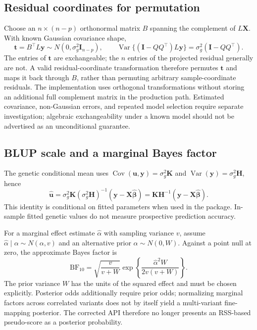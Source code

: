 \documentclass[11pt]{article}
\newcommand{\y}{\mathbf{y}}
\newcommand{\K}{\mathbf{K}}
\newcommand{\X}{\mathbf{X}}
\newcommand{\I}{\mathbf{I}}
\newcommand{\Hm}{\mathbf{H}}
\newcommand{\Var}{\operatorname{Var}}
\begin{document}
\subsection{Residual coordinates for permutation}

Choose an $n\times(n-p)$ orthonormal matrix $B$ spanning the complement
of $L\X$. With known Gaussian covariance shape,
\begin{equation}
 \mathbf t=B^\top L\y\sim N(0,\sigma_g^2\I_{n-p}),\qquad
 \Var\{(\I-QQ^\top)L\y\}=\sigma_g^2(\I-QQ^\top).
 \label{eq:permutation}
\end{equation}
The entries of $\mathbf t$ are exchangeable; the $n$ entries of the
projected residual generally are not. A valid residual-coordinate
transformation therefore permutes $\mathbf t$ and maps it back through
$B$, rather than permuting arbitrary sample-coordinate residuals.
The implementation uses orthogonal transformations without storing an
additional full complement matrix in the production path. Estimated
covariance, non-Gaussian errors, and repeated model selection require
separate investigation; algebraic exchangeability under a known model
should not be advertised as an unconditional guarantee.

\subsection{BLUP scale and a marginal Bayes factor}

The genetic conditional mean uses
$\operatorname{Cov}(\mathbf u,\y)=\sigma_g^2\K$ and
$\Var(\y)=\sigma_g^2\Hm$, hence
\begin{equation}
 \widehat{\mathbf u}=\sigma_g^2\K(\sigma_g^2\Hm)^{-1}
 (\y-\X\widehat{\boldsymbol\beta})
 =\K\Hm^{-1}(\y-\X\widehat{\boldsymbol\beta}).
 \label{eq:blup}
\end{equation}
This identity is conditional on fitted parameters when used in the
package. In-sample fitted genetic values do not measure prospective
prediction accuracy.

For a marginal effect estimate $\widehat\alpha$ with sampling variance
$v$, assume $\widehat\alpha\mid\alpha\sim N(\alpha,v)$ and an
alternative prior $\alpha\sim N(0,W)$. Against a point null at zero,
the approximate Bayes factor is
\begin{equation}
 \mathrm{BF}_{10}=\sqrt{\frac{v}{v+W}}
 \exp\left\{\frac{\widehat\alpha^2 W}{2v(v+W)}\right\}.
 \label{eq:abf}
\end{equation}
The prior variance $W$ has the units of the squared effect and must be
chosen explicitly. Posterior odds additionally require prior odds;
normalizing marginal factors across correlated variants does not by
itself yield a multi-variant fine-mapping posterior. The corrected API
therefore no longer presents an RSS-based pseudo-score as a posterior
probability.
\end{document}
